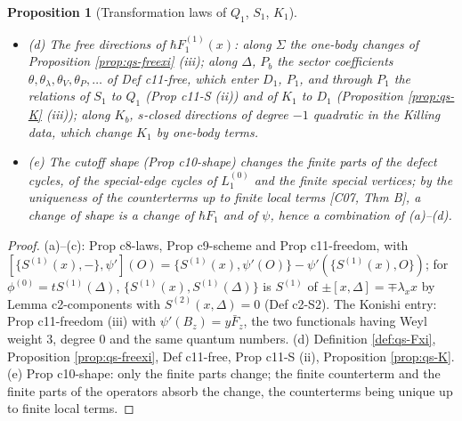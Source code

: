 \documentclass[11pt]{article}
\numberwithin{equation}{section}
\theoremstyle{plain}
\newtheorem{proposition}[theorem]{Proposition}
\theoremstyle{definition}
\begin{document}
\begin{proposition}[Transformation laws of $Q_1$, $S_1$, $K_1$]
\begin{itemize}
\item (d) The free directions of $\hbar F_1^{(1)}(x)$: along $\Sigma$ the one-body changes of Proposition \ref{prop:qs-freexi} (iii); along $\Delta$, $P_b$ the sector coefficients $\theta,\theta_\lambda,\theta_V,\theta_P,\dots$ of Def c11-free, which enter $D_1$, $P_1$, and through $P_1$ the relations of $S_1$ to $Q_1$ (Prop c11-S (ii)) and of $K_1$ to $D_1$ (Proposition \ref{prop:qs-K} (iii)); along $K_b$, $s$-closed directions of degree $-1$ quadratic in the Killing data, which change $K_1$ by one-body terms.
\item (e) The cutoff shape (Prop c10-shape) changes the finite parts of the defect cycles, of the special-edge cycles of $L_1^{(0)}$ and the finite special vertices; by the uniqueness of the counterterms up to finite local terms [C07, Thm B], a change of shape is a change of $\hbar F_1$ and of $\psi$, hence a combination of (a)--(d).
\end{itemize}
\end{proposition}

\begin{proof}
(a)--(c): Prop c8-laws, Prop c9-scheme and Prop c11-freedom, with $[\{S^{(1)}(x),-\},\psi'](O)=\{S^{(1)}(x),\psi'(O)\}-\psi'(\{S^{(1)}(x),O\})$; for $\phi^{(0)}=tS^{(1)}(\Delta)$, $\{S^{(1)}(x),S^{(1)}(\Delta)\}$ is $S^{(1)}$ of $\pm[x,\Delta]=\mp\lambda_xx$ by Lemma c2-components with $S^{(2)}(x,\Delta)=0$ (Def c2-S2). The Konishi entry: Prop c11-freedom (iii) with $\psi'(B_z)=y\bar F_z$, the two functionals having Weyl weight $3$, degree $0$ and the same quantum numbers. (d) Definition \ref{def:qs-Fxi}, Proposition \ref{prop:qs-freexi}, Def c11-free, Prop c11-S (ii), Proposition \ref{prop:qs-K}. (e) Prop c10-shape: only the finite parts change; the finite counterterm and the finite parts of the operators absorb the change, the counterterms being unique up to finite local terms.
\end{proof}
\end{document}
